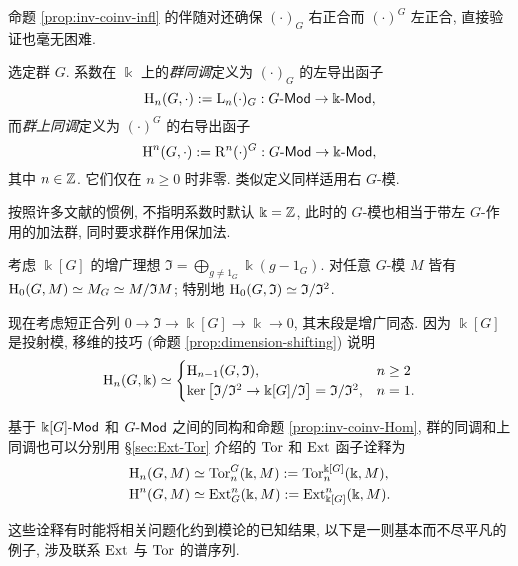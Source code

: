 命题 \ref{prop:inv-coinv-infl} 的伴随对还确保 $(\cdot)_G$ 右正合而 $(\cdot)^G$ 左正合, 直接验证也毫无困难.

\begin{definition}[群的同调与上同调]\label{def:group-coh-ho}
	选定群 $G$. 系数在 $\Bbbk$ 上的\emph{群同调}定义为 $(\cdot)_G$ 的左导出函子
	\[ \operatorname{H}_n(G, \cdot) := \mathrm{L}_n (\cdot)_G: G\text{-}\mathsf{Mod} \to \Bbbk\text{-}\mathsf{Mod}, \]
	而\emph{群上同调}定义为 $(\cdot)^G$ 的右导出函子
	\[ \operatorname{H}^n(G, \cdot) := \mathrm{R}^n (\cdot)^G: G\text{-}\mathsf{Mod} \to \Bbbk\text{-}\mathsf{Mod}, \]
	其中 $n \in \mathbb{Z}$. 它们仅在 $n \geq 0$ 时非零. 类似定义同样适用右 $G$-模.
\end{definition}

按照许多文献的惯例, 不指明系数时默认 $\Bbbk = \mathbb{Z}$, 此时的 $G$-模也相当于带左 $G$-作用的加法群, 同时要求群作用保加法.

\begin{example}\label{eg:group-H1}
	考虑 $\Bbbk[G]$ 的增广理想 $\mathfrak{I} = \bigoplus_{g \neq 1_G} \Bbbk (g - 1_G)$. 对任意 $G$-模 $M$ 皆有 $\operatorname{H}_0(G, M) \simeq M_G \simeq M/\mathfrak{I}M$; 特别地 $\operatorname{H}_0(G, \mathfrak{I}) \simeq \mathfrak{I}/\mathfrak{I}^2$.

	现在考虑短正合列 $0 \to \mathfrak{I} \to \Bbbk[G] \to \Bbbk \to 0$, 其末段是增广同态. 因为 $\Bbbk[G]$ 是投射模, 移维的技巧 (命题 \ref{prop:dimension-shifting}) 说明
	\[ \operatorname{H}_n(G, \Bbbk) \simeq \begin{cases}
		\operatorname{H}_{n-1}(G, \mathfrak{I}), & n \geq 2 \\
		\operatorname{ker}\left[ \mathfrak{I}/\mathfrak{I}^2 \to \Bbbk[G]/\mathfrak{I} \right] = \mathfrak{I}/\mathfrak{I}^2 , & n = 1.
	\end{cases}\]
\end{example}

基于 $\Bbbk[G]\text{-}\mathsf{Mod}$ 和 $G\text{-}\mathsf{Mod}$ 之间的同构和命题 \ref{prop:inv-coinv-Hom}, 群的同调和上同调也可以分别用 \S\ref{sec:Ext-Tor} 介绍的 $\operatorname{Tor}$ 和 $\operatorname{Ext}$ 函子诠释为
\begin{equation}\label{eqn:grp-Hm-Tor-Ext}\begin{aligned}
	\operatorname{H}_n(G, M) & \simeq \operatorname{Tor}^G_n(\Bbbk, M) := \operatorname{Tor}^{\Bbbk[G]}_n(\Bbbk, M), \\
	\operatorname{H}^n(G, M) & \simeq \operatorname{Ext}_G^n(\Bbbk, M) := \operatorname{Ext}_{\Bbbk[G]}^n(\Bbbk, M).
\end{aligned}\end{equation}

这些诠释有时能将相关问题化约到模论的已知结果, 以下是一则基本而不尽平凡的例子, 涉及联系 $\operatorname{Ext}$ 与 $\operatorname{Tor}$ 的谱序列.

